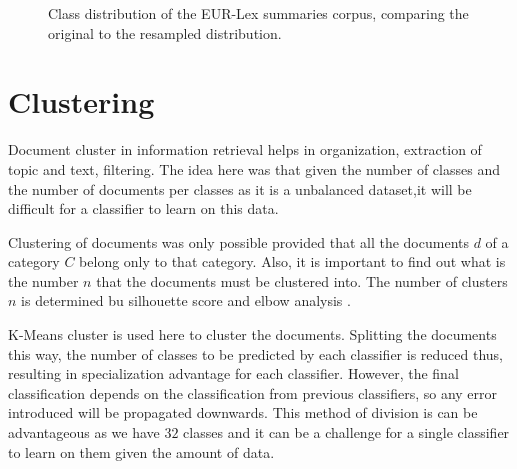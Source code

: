 \begin{figure}[!ht]
\begin{center}
{
}
\end{center}
\captionsetup{justification=centering,margin=2cm}
\caption{Class distribution of the EUR-Lex summaries corpus, comparing the original
to the resampled distribution.}
\label{graph:originalVSresampled}
\end{figure}


\section{Clustering} \label{clustering}
Document cluster in information retrieval helps in organization, extraction of topic and text, filtering. The idea here was that given the number of classes and the number of documents per classes as it is a unbalanced dataset,it will be difficult for a classifier to learn on this data. 

Clustering of documents was only possible provided that all the documents $d$ of a category $C$ belong only to that category. Also, it is important to find out what is the number $n$ that the documents must be clustered into. The number of clusters $n$ is determined bu silhouette score \cite{rousseeuw1987silhouettes} and elbow analysis \cite{thorndike1953belongs}. 

K-Means cluster is used here to cluster the documents. Splitting the documents this way, the number of classes to be predicted by each classifier is reduced thus, resulting in specialization advantage for each classifier. However, the final classification depends on the classification from previous classifiers, so any error introduced will be propagated downwards. This method of division is can be advantageous as we have $32$ classes and it can be a challenge for a single classifier to learn on them given the amount of data.

